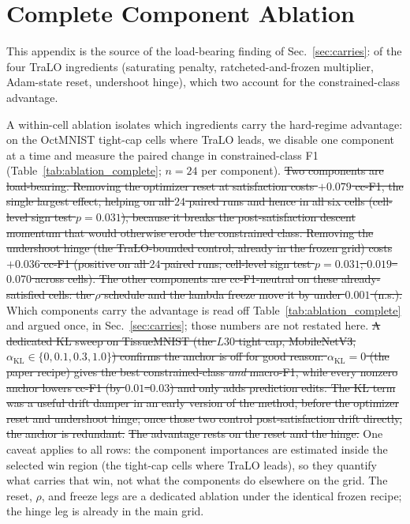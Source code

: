 \documentclass[10pt]{article}
\newcommand{\del}[1]{{\color{red}\sout{#1}}}
\begin{document}
\section{Complete Component Ablation}
\label{app:ablation}

This appendix is the source of the load-bearing finding of
Sec.~\ref{sec:carries}: of the four TraLO ingredients (saturating
penalty, ratcheted-and-frozen multiplier, Adam-state reset, undershoot
hinge), which two account for the constrained-class advantage.

A within-cell ablation isolates which ingredients carry the hard-regime
advantage: on the OctMNIST tight-cap cells where TraLO leads, we disable
one component at a time and measure the paired change in
constrained-class F1 (Table~\ref{tab:ablation_complete}; $n{=}24$ per
component).
\del{Two components are load-bearing. Removing the optimizer
reset at satisfaction costs \mbox{$+0.079$} cc-F1, the single largest effect,
helping on all \mbox{$24$} paired runs and hence in all six cells (cell-level
sign test \mbox{$p\!=\!0.031$}), because it breaks the post-satisfaction
descent momentum that would otherwise erode the constrained class.
Removing the undershoot hinge (the TraLO-bounded control, already in
the frozen grid) costs \mbox{$+0.036$} cc-F1 (positive on all \mbox{$24$} paired
runs; cell-level sign test \mbox{$p\!=\!0.031$}; \mbox{$0.019$--$0.070$} across cells).
The other components are cc-F1-neutral on these already-satisfied
cells: the \mbox{$\rho$} schedule and the lambda freeze move it by under \mbox{$0.001$}
(n.s.).}
{\color{blue}Which components carry the advantage is read off
Table~\ref{tab:ablation_complete} and argued once, in Sec.~\ref{sec:carries};
those numbers are not restated here.} \del{A dedicated KL sweep on TissueMNIST (the \mbox{$L30$} tight cap,
MobileNetV3, \mbox{$\alpha_{\mathrm{KL}}\!\in\!\{0,0.1,0.3,1.0\}$}) confirms the
anchor is off for good reason: \mbox{$\alpha_{\mathrm{KL}}{=}0$} (the paper
recipe) gives the best constrained-class \emph{and} macro-F1, while
every nonzero anchor lowers cc-F1 (by \mbox{$0.01$--$0.03$}) and only adds
prediction edits. The KL term was a useful drift damper in an early
version of the method, before the optimizer reset and undershoot hinge;
once those two control post-satisfaction drift directly, the anchor is
redundant.} \del{The advantage rests on the reset and the hinge.} One caveat
applies to all rows: the component importances are estimated inside the
selected win region (the tight-cap cells where TraLO leads), so they
quantify what carries that win, not what the components do elsewhere on
the grid. The reset, $\rho$, and freeze legs are a dedicated ablation
under the identical frozen recipe; the hinge leg is already in the main
grid.
\end{document}
